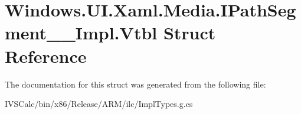 \hypertarget{struct_windows_1_1_u_i_1_1_xaml_1_1_media_1_1_i_path_segment_____impl_1_1_vtbl}{}\section{Windows.\+U\+I.\+Xaml.\+Media.\+I\+Path\+Segment\+\_\+\+\_\+\+Impl.\+Vtbl Struct Reference}
\label{struct_windows_1_1_u_i_1_1_xaml_1_1_media_1_1_i_path_segment_____impl_1_1_vtbl}


The documentation for this struct was generated from the following file\+:\begin{DoxyCompactItemize}
\item 
I\+V\+S\+Calc/bin/x86/\+Release/\+A\+R\+M/ilc/Impl\+Types.\+g.\+cs\end{DoxyCompactItemize}

